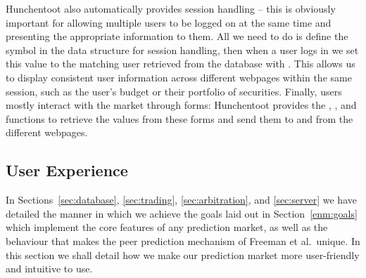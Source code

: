 Hunchentoot also automatically provides session handling -- this is obviously
important for allowing multiple users to be logged on at the same time and
presenting the appropriate information to them. All we need to do is define the
symbol  in the data structure for session handling, then
when a user logs in we set this value to the matching user retrieved from the
database with . This allows us to display
consistent user information across different webpages within the same session,
such as the user's budget or their portfolio of securities. Finally, users
mostly interact with the market through forms: Hunchentoot provides the
, , and  functions to
retrieve the values from these forms and send them to and from the different
webpages.


\subsection{User Experience}

\label{sec:user-experience}

In Sections~\ref{sec:database}, \ref{sec:trading}, \ref{sec:arbitration}, and
\ref{sec:server} we have detailed the manner in which we achieve the goals laid
out in Section~\ref{enm:goals} which implement the core features of any
prediction market, as well as the behaviour that makes the peer prediction
mechanism of Freeman et al.\ unique. In this section we shall detail how we
make our prediction market more user-friendly and intuitive to use.

